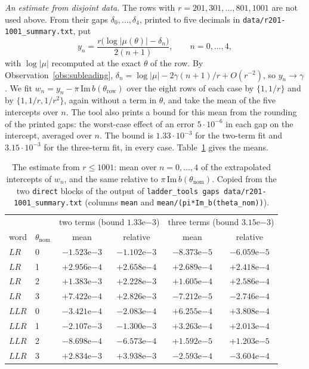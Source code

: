 \documentclass[11pt]{amsart}
\theoremstyle{definition}
\theoremstyle{remark}
\begin{document}
\emph{An estimate from disjoint data.} The rows with $r = 201, 301, \dots, 801, 1001$
are not used above. From their gaps $\delta_0, \dots, \delta_4$, printed to five
decimals in \texttt{data/r201-1001\_summary.txt}, put
\[
y_n = \frac{r\big(\log|\mu(\theta)| - \delta_n\big)}{2(n+1)}, \qquad n = 0, \dots, 4,
\]
with $\log|\mu|$ recomputed at the exact $\theta$ of the row. By
Observation~\ref{obs:subleading}, $\delta_n = \log|\mu| - 2\gamma(n+1)/r + O(r^{-2})$,
so $y_n \to \gamma$. We fit $w_n = y_n - \pi\,\mathrm{Im}\,b(\theta_{\mathrm{row}})$
over the eight rows of each case by $\{1, 1/r\}$ and by $\{1, 1/r, 1/r^2\}$, again
without a term in $\theta$, and take the mean of the five intercepts over $n$. The
tool also prints a bound for this mean from the rounding of the printed gaps: the
worst-case effect of an error $5\cdot10^{-6}$ in each gap on the intercept, averaged
over $n$. The bound is $1.33\cdot10^{-3}$ for the two-term fit and $3.15\cdot10^{-3}$
for the three-term fit, in every case. Table~\ref{tab:gapsdirect} gives the means.

\begin{table}[ht]
\centering
\begin{tabular}{llcccc}
\toprule
& & \multicolumn{2}{c}{two terms (bound $1.33\mathrm{e}{-3}$)}
& \multicolumn{2}{c}{three terms (bound $3.15\mathrm{e}{-3}$)} \\
word & $\theta_{\mathrm{nom}}$ & mean & relative & mean & relative \\
\midrule
$LR$  & 0 & $-1.523\mathrm{e}{-3}$ & $-1.102\mathrm{e}{-3}$ & $-8.373\mathrm{e}{-5}$ & $-6.059\mathrm{e}{-5}$ \\
$LR$  & 1 & $+2.956\mathrm{e}{-4}$ & $+2.658\mathrm{e}{-4}$ & $+2.689\mathrm{e}{-4}$ & $+2.418\mathrm{e}{-4}$ \\
$LR$  & 2 & $+1.383\mathrm{e}{-3}$ & $+2.228\mathrm{e}{-3}$ & $+1.605\mathrm{e}{-4}$ & $+2.586\mathrm{e}{-4}$ \\
$LR$  & 3 & $+7.422\mathrm{e}{-4}$ & $+2.826\mathrm{e}{-3}$ & $-7.212\mathrm{e}{-5}$ & $-2.746\mathrm{e}{-4}$ \\
$LLR$ & 0 & $-3.421\mathrm{e}{-4}$ & $-2.083\mathrm{e}{-4}$ & $+6.255\mathrm{e}{-4}$ & $+3.808\mathrm{e}{-4}$ \\
$LLR$ & 1 & $-2.107\mathrm{e}{-3}$ & $-1.300\mathrm{e}{-3}$ & $+3.263\mathrm{e}{-4}$ & $+2.013\mathrm{e}{-4}$ \\
$LLR$ & 2 & $-8.698\mathrm{e}{-4}$ & $-6.573\mathrm{e}{-4}$ & $+1.592\mathrm{e}{-5}$ & $+1.203\mathrm{e}{-5}$ \\
$LLR$ & 3 & $+2.834\mathrm{e}{-3}$ & $+3.938\mathrm{e}{-3}$ & $-2.593\mathrm{e}{-4}$ & $-3.604\mathrm{e}{-4}$ \\
\bottomrule
\end{tabular}
\caption{The estimate from $r \le 1001$: mean over $n = 0, \dots, 4$ of the
extrapolated intercepts of $w_n$, and the same relative to
$\pi\,\mathrm{Im}\,b(\theta_{\mathrm{nom}})$. Copied from the two \texttt{direct}
blocks of the output of \texttt{ladder\_tools gaps data/r201-1001\_summary.txt}
(columns \texttt{mean} and \texttt{mean/(pi*Im\_b(theta\_nom))}).}
\label{tab:gapsdirect}
\end{table}
\end{document}
